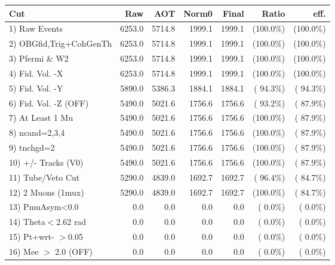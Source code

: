  \begin{table}[h!]\centering
 \begin{tabular}{||l||r|r|r|r|r|r||}
 \hline
 \hline
 Cut & Raw & AOT & Norm0 & Final & Ratio & eff.       \\
 \hline
  1) Raw Events           &       6253.0 &       5714.8 &       1999.1 &       1999.1 & (100.0\%) & (100.0\%) \\
  2) OBGfid,Trig+CohGenTh &       6253.0 &       5714.8 &       1999.1 &       1999.1 & (100.0\%) & (100.0\%) \\
  3) Pfermi \& W2         &       6253.0 &       5714.8 &       1999.1 &       1999.1 & (100.0\%) & (100.0\%) \\
  4) Fid. Vol. -X         &       6253.0 &       5714.8 &       1999.1 &       1999.1 & (100.0\%) & (100.0\%) \\
  5) Fid. Vol. -Y         &       5890.0 &       5386.3 &       1884.1 &       1884.1 & ( 94.3\%) & ( 94.3\%) \\
  6) Fid. Vol. -Z (OFF)   &       5490.0 &       5021.6 &       1756.6 &       1756.6 & ( 93.2\%) & ( 87.9\%) \\
  7) At Least 1 Mu        &       5490.0 &       5021.6 &       1756.6 &       1756.6 & (100.0\%) & ( 87.9\%) \\
  8) ncand=2,3,4          &       5490.0 &       5021.6 &       1756.6 &       1756.6 & (100.0\%) & ( 87.9\%) \\
  9) tnchgd=2             &       5490.0 &       5021.6 &       1756.6 &       1756.6 & (100.0\%) & ( 87.9\%) \\
 10) +/- Tracks (V0)      &       5490.0 &       5021.6 &       1756.6 &       1756.6 & (100.0\%) & ( 87.9\%) \\
 11) Tube/Veto Cut        &       5290.0 &       4839.0 &       1692.7 &       1692.7 & ( 96.4\%) & ( 84.7\%) \\
 12) 2 Muons (1mux)       &       5290.0 &       4839.0 &       1692.7 &       1692.7 & (100.0\%) & ( 84.7\%) \\
 13) PmuAsym<0.0          &          0.0 &          0.0 &          0.0 &          0.0 & (  0.0\%) & (  0.0\%) \\
 14) Theta$<$2.62 rad     &          0.0 &          0.0 &          0.0 &          0.0 & (  0.0\%) & (  0.0\%) \\
 15) Pt+wrt- $>$0.05      &          0.0 &          0.0 &          0.0 &          0.0 & (  0.0\%) & (  0.0\%) \\
 16) Mee $>$ 2.0  (OFF)   &          0.0 &          0.0 &          0.0 &          0.0 & (  0.0\%) & (  0.0\%) \\

\end{tabular}
\end{table}
